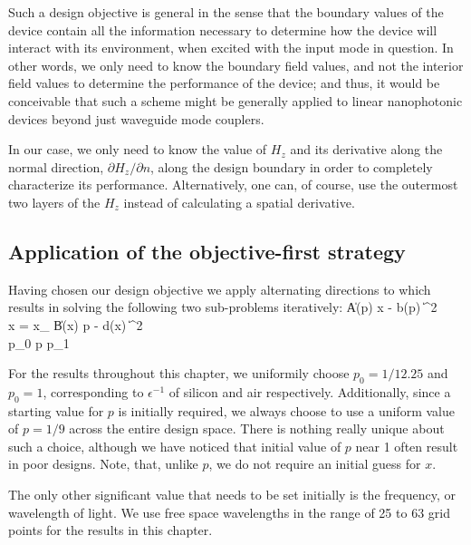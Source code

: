 
Such a design objective is general
    in the sense that the boundary values of the device 
    contain all the information necessary to determine
    how the device will interact with its environment,
    when excited with the input mode in question.
In other words,
    we only need to know the boundary field values,
    and not the interior field values to determine 
    the performance of the device;
    and thus, it would be conceivable that such a scheme
    might be generally applied to linear nanophotonic devices beyond 
    just waveguide mode couplers.

In our case,
    we only need to know the value of $H_z$ and 
    its derivative along the normal direction, $\partial H_z / \partial n$,
    along the design boundary
    in order to completely characterize its performance.
Alternatively,
    one can, of course, use the outermost two layers of the $H_z$
    instead of calculating a spatial derivative.

\subsection{Application of the objective-first strategy}
Having chosen our design objective we apply
    alternating directions to  which 
    results in solving the following two sub-problems iteratively:
\BA {} \| A(p) x - b(p) \|^2 \\
    \subto x = x_  \notag \EA
\BA {} \| B(x) p - d(x) \|^2 \\
    \subto p_0 \le p \le p_1 \notag \EA

For the results throughout this chapter, 
    we uniformily choose $p_0 = 1/12.25$ and $p_0 = 1$,
    corresponding to $\epsilon^{-1}$ of silicon and air respectively.
Additionally, since a starting value for $p$ is initially required,
    we always choose to use a uniform value of $p = 1/9$ 
    across the entire design space.
There is nothing really unique about such a choice,
    although we have noticed that initial value of $p$ near 1 
    often result in poor designs.
Note, that, unlike $p$, we do not require an initial guess for $x$.

The only other significant value that needs to be set initially
    is the frequency, or wavelength of light.
We use free space wavelengths in the range of 25 to 63 grid points for
    the results in this chapter.

